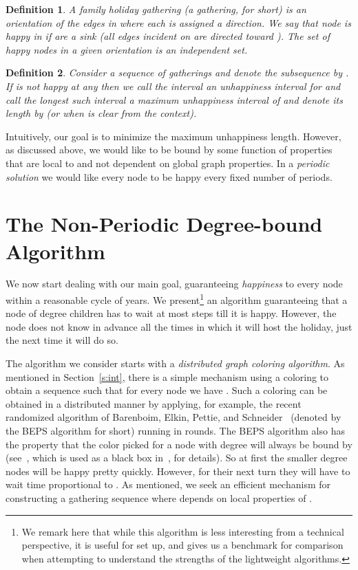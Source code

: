 \documentclass[11pt]{article}
\newtheorem{definition}{Definition}[section]
\begin{document}
\begin{definition}\label{d:gathering}
A {\em family holiday gathering} (a {\em gathering},
for short) is an orientation  of the edges in  where each  is assigned a direction. We say that node  is {\em happy} in  if  are a sink (all edges incident on  are directed toward ). The set of happy nodes in a given orientation is an independent set.
\end{definition}





\begin{definition}\label{d:seg}
Consider a sequence  of
gatherings and denote the subsequence  by
. If  is not happy at any  then we
call the interval  an {\em unhappiness interval} for
 and call the longest such interval a {\em maximum unhappiness interval} of  and denote its length by  (or  when  is clear from the context).
\end{definition}



Intuitively, our goal is to minimize the maximum unhappiness
length. However, as discussed above, we would like  to be bound by some function of properties that are local to  and not dependent on global graph properties. In a {\em periodic solution} we would like every node  to be happy every fixed number of periods.

\section{The Non-Periodic Degree-bound Algorithm}\label{s:global}


We now start dealing with our main goal, guaranteeing {\em happiness} to
every node within a reasonable cycle of years. We present\footnote{We remark here that while this algorithm is less interesting from a technical perspective, it is useful for set up, and gives us a benchmark for comparison when attempting to understand the strengths of the lightweight algorithms.
} an algorithm guaranteeing that a node of degree  children has to wait at most  steps till  it is happy.  However, the node does not know in advance all the times in which it will host the holiday, just the next time it will  do so.

The algorithm we consider starts with a {\em distributed graph
coloring algorithm}. As mentioned in Section~\ref{s:int}, there is a simple mechanism using a  coloring to obtain a
sequence  such that for every node  we have . Such a coloring can be obtained in a distributed manner by applying, for example, the recent randomized algorithm of Barenboim, Elkin, Pettie, and Schneider~\cite{BEPS12} (denoted by the BEPS algorithm for short) running in  rounds. The BEPS algorithm also has the property that the color  picked for a node with degree  will always be bound by  (see~\cite{Johansson99}, which is used as a black box in~\cite{BEPS12}, for details). So at first the smaller degree nodes will be happy pretty quickly. However, for their next turn they will have to wait time proportional to .
As mentioned, we seek an efficient mechanism for constructing a gathering sequence  where  depends on local properties of .
\end{document}
